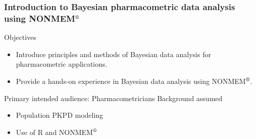 \documentclass{beamer}
\begin{document}
\begin{frame}
  \frametitle{Introduction to
  Bayesian pharmacometric data analysis using NONMEM$^\text{\textregistered}$}
  
\begin{block}{Objectives}
  \begin{itemize}
  \item Introduce principles and methods of Bayesian data analysis for pharmacometric
  applications.
\item Provide a hands-on experience in Bayesian data analysis using NONMEM$^\text{\textregistered}$.
  \end{itemize}
\end{block}
\begin{block}{Primary intended audience: Pharmacometricians}
  Background assumed
  \begin{itemize}
  \item Population PKPD modeling
  \item Use of R and NONMEM$^\text{\textregistered}$
  \end{itemize}
\end{block}

\end{frame}
\end{document}
